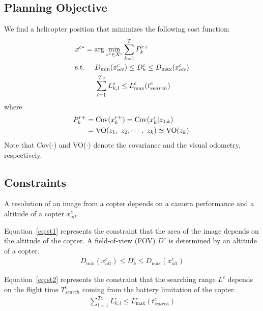 \documentclass[conference]{IEEEtran}
\begin{document}
\subsection{Planning Objective}

We find a helicopter position that minimizes the following cost function:
\begin{align}
    &x^{c*}=\arg\min_{x^c \in X^c} \sum^T_{k=1} P^{r+}_k\label{eq:c1}\\
     &{\rm s.t.} \hspace{5mm} D_{\min}(x^c_{alt}) \leq D^c_k \leq D_{\max}(x^c_{alt})\label{eq:st1}\\
    &\hspace{10mm} \sum^{Tc}_{l=1} L^c_{k,l} \leq L^c_{\max}(t^c_{search})\label{eq:st2}
\end{align}
where
\begin{align}
P^{r+}_k&={\rm Cov}(x^{r+}_k) = {\rm Cov}(x^{r}_k | z_{0:k})\label{eq:p1}\\
&={\rm VO}(z_1,~z_2,\cdots,~z_k)\simeq {\rm VO}(z_k).\label{eq:p2}
\end{align}
Note that Cov($\cdot$) and VO($\cdot$) denote the covariance and the visual odometry, respectively.

\subsection{Constraints}

A resolution of an image from a copter depends on a camera performance and a altitude of a copter $x^c_{alt}$.

Equation~\eqref{eq:st1} represents the constraint that the area of the image depends on the altitude of the copter.
A field-of-view (FOV) $D^c$ is determined by an altitude of a copter.
\begin{align}
    D_{\min}(x^c_{alt}) \leq D^c_k \leq D_{\max}(x^c_{alt})
\end{align}

Equation~\eqref{eq:st2} represents the constraint that the searching range $L^c$ depends on the flight time $T^c_{search}$ coming from the battery limitation of the copter.
\begin{align}
    \sum^{Tc}_{l=1} L^c_{k,l} \leq L^c_{\max}(t^c_{search})
\end{align}
\end{document}
